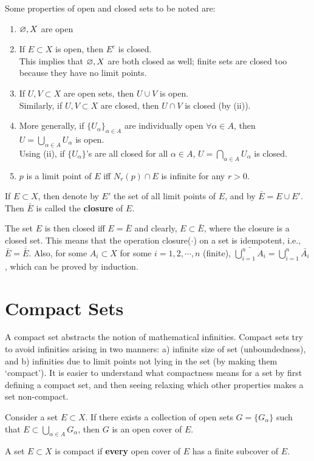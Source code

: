 Some properties of open and closed sets to be noted are:
\begin{enumerate}[label=(\roman*)]
\item $\varnothing,X$ are open
\item If $E\subset X$ is open, then $E^c$ is closed.\\
This implies that $\varnothing,X$ are both closed as well; finite sets are closed too because they have no limit points.
\item If $U,V\subset X$ are open sets, then $U \cup V$ is open.\\
Similarly, if $U,V\subset X$ are closed, then $U\cap V$ is closed (by (ii)).
\item More generally, if $\{U_\alpha\}_{\alpha\in A}$ are individually open $\forall \alpha\in A$, then $U=\bigcup\limits_{\alpha\in A} U_\alpha$ is open.\\
Using (ii), if $\{U_\alpha\}$'s are all closed for all $\alpha\in A$, $U=\bigcap\limits_{\alpha\in A} U_\alpha$ is closed.
\item $p$ is a limit point of $E$ iff $N_r(p)\cap E$ is infinite for any $r>0$.
\end{enumerate}

\begin{definition}
If $E\subset X$, then denote by $E'$ the set of all limit points of $E$, and by $\bar{E}=E\cup E'$. Then $\bar{E}$ is called the \textbf{closure} of $E$.
\end{definition}
The set $E$ is then closed iff $E=\bar{E}$ and clearly, $E\subset \bar{E}$, where the closure is a closed set. This means that the operation closure($\cdot$) on a set is idempotent, i.e., $\bar{E} = \overline{\bar{E}}$.
Also, for some $A_i\subset X$ for some $i=1,2,\cdots,n$ (finite), $\bar{\bigcup\limits^n_{i=1}A_i} = \bigcup\limits^n_{i=1}\bar{A_i}$, which can be proved by induction.

\section{Compact Sets}
A compact set abstracts the notion of mathematical infinities. Compact sets try to avoid infinities arising in two manners: a) infinite size of set (unboundedness), and b) infinities due to limit points not lying in the set (by making them `compact'). It is easier to understand what compactness means for a set by first defining a compact set, and then seeing relaxing which other properties makes a set non-compact.

\begin{definition}
Consider a set $E\subset X$. If there exists a collection of open sets $G=\{G_\alpha\}$ such that $E\subset \bigcup\limits_{\alpha\in A}G_\alpha$, then $G$ is an open cover of $E$.
\end{definition}
\begin{definition}
A set $E\subset X$ is compact if \textbf{every} open cover of $E$ has a finite subcover of $E$.
\end{definition}

